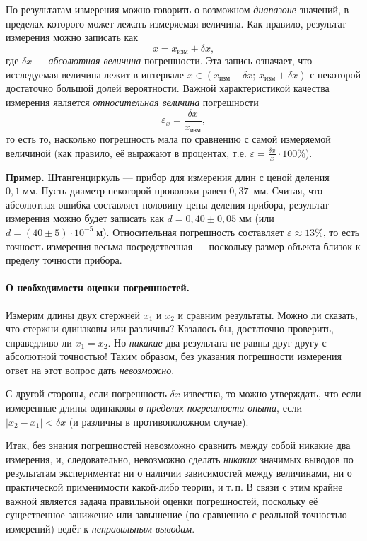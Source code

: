 \documentclass[10pt]{article}
\begin{document}
По результатам измерения можно говорить о возможном \emph{диапазоне}
значений, в пределах которого может лежать измеряемая величина. Как
правило, результат измерения можно записать как
\[
x=x_{\text{изм}}\pm\delta x,
\]
где $\delta x$ --- \emph{абсолютная величина} погрешности.
Эта запись означает, что исследуемая величина лежит в интервале $x\in(x_{\text{изм}}-\delta x;\,x_{\text{изм}}+\delta x)$
с некоторой достаточно большой долей вероятности. Важной характеристикой
качества измерения является \emph{относительная величина} погрешности
\[
\varepsilon_{x}=\frac{\delta x}{x_{\text{изм}}},
\]
то есть то, насколько погрешность мала по сравнению с самой измеряемой
величиной (как правило, её выражают в процентах, т.е. $\varepsilon=\frac{\delta x}{x}\cdot100\%$).

{\footnotesize
\textbf{Пример.} Штангенциркуль ---
прибор для измерения длин с ценой деления $0{,}1\;\text{мм}$. Пусть
диаметр некоторой проволоки равен $0{,}37$~мм. Считая, что абсолютная
ошибка составляет половину цены деления прибора, результат измерения
можно будет записать как $d=0{,}40\pm0{,}05\;\text{мм}$ (или $d=(40\pm5)\cdot10^{-5}\;\text{м}$).
Относительная погрешность составляет $\varepsilon\approx13\%$, то
есть точность измерения весьма посредственная --- поскольку
размер объекта близок к пределу точности прибора.\par
} %

\paragraph{О необходимости оценки погрешностей.}

Измерим длины двух стержней $x_{1}$ и $x_{2}$ и сравним результаты.
Можно ли сказать, что стержни одинаковы или различны? Казалось бы,
достаточно проверить, справедливо ли $x_{1}=x_{2}$. Но \emph{никакие}
два результата не равны друг другу с абсолютной точностью! Таким образом,
без указания погрешности измерения ответ на этот вопрос дать \emph{невозможно}. 

С другой стороны, если погрешность $\delta x$ известна, то можно
утверждать, что если измеренные длины одинаковы \emph{в пределах погрешности
опыта}, если $|x_{2}-x_{1}|<\delta x$ (и различны в противоположном
случае).

Итак, без знания погрешностей невозможно сравнить между собой никакие
два измерения, и, следовательно, невозможно сделать \emph{никаких}
значимых выводов по результатам эксперимента: ни о наличии зависимостей
между величинами, ни о практической применимости какой-либо теории,
и т.\,п. В связи с этим крайне важной является задача правильной
оценки погрешностей, поскольку её существенное занижение или завышение
(по сравнению с реальной точностью измерений) ведёт к \emph{неправильным
выводам}.
\end{document}
